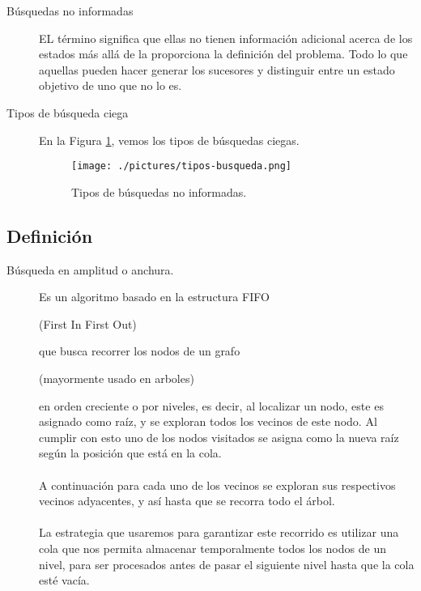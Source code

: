 \documentclass[letterpaper,12pt]{article}
\begin{document}
	\begin{description}
		\item[B\'usquedas no informadas \begin{small} (a ciegas) \end{small}] EL t\'ermino significa que ellas no tienen informaci\'on adicional acerca de los estados m\'as all\'a de la proporciona la definici\'on del problema. Todo lo que aquellas pueden hacer generar los sucesores y distinguir entre un estado objetivo de uno que no lo es.
		
		\item[Tipos de b\'usqueda ciega] En la Figura \ref{tipo:busqueda}, vemos los tipos de b\'usquedas ciegas.

  	\begin{figure}[!hbt]
  		\centering
  	  	\texttt{[image: ./pictures/tipos-busqueda.png]}
	  	\caption{Tipos  de b\'usquedas no informadas. }
	  	\label{tipo:busqueda}
		\end{figure}
		
	\end{description}

	\subsection{Definici\'on}
		
		\begin{description}
			\item[B\'usqueda en amplitud o anchura.] Es un algoritmo basado en la estructura FIFO \begin{small} (First In First Out)	\end{small} que busca recorrer los nodos de un grafo \begin{small} (mayormente usado en arboles) \end{small} en orden creciente o por niveles, es decir, al localizar un nodo, este es asignado como ra\'iz, y se exploran todos los vecinos de este nodo. Al cumplir con esto uno de los nodos visitados se asigna como la nueva ra\'iz seg\'un la posici\'on que est\'a en la cola. \\
			\\
			A continuaci\'on para cada uno de los vecinos se exploran sus respectivos vecinos adyacentes, y as\'i hasta que se recorra todo el \'arbol.\\
			\\
			La estrategia que usaremos para garantizar este recorrido es utilizar una cola que nos permita almacenar temporalmente todos los nodos de un nivel, para ser procesados antes de pasar el siguiente nivel hasta que la cola est\'e vac\'ia.\\
			\\
			
	\end{description}
\end{document}
